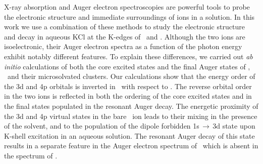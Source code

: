 X-ray absorption and Auger electron spectroscopies are powerful tools to probe the electronic structure and immediate surroundings of ions in a solution. In this work we use a combination of these methods to study the electronic structure and decay in aqueous KCl at the K-edges of \ki~and \cli. Although the two ions are isoelectronic, their Auger electron spectra as a function of the photon energy exhibit notably different features. To explain these differences, we carried out {\it ab initio} calculations of both the core excited states and the final Auger states of \ki, \cli~and their microsolvated clusters. Our calculations show that the energy order of the 3d and 4p orbitals is inverted in \ki~with respect to \cli. The reverse orbital order in the two ions is reflected in both the ordering of the core excited states and in the final states populated in the resonant Auger decay. The energetic proximity of the 3d and 4p virtual states in the bare \ki~ion leads to their mixing in the presence of the solvent, and to the population of the dipole forbidden 1s$\,\rightarrow\,$3d state upon K-shell excitation in an aqueous solution. The resonant Auger decay of this state results in a separate feature in the Auger electron spectrum of \ki~which is absent in the spectrum of \cli.

